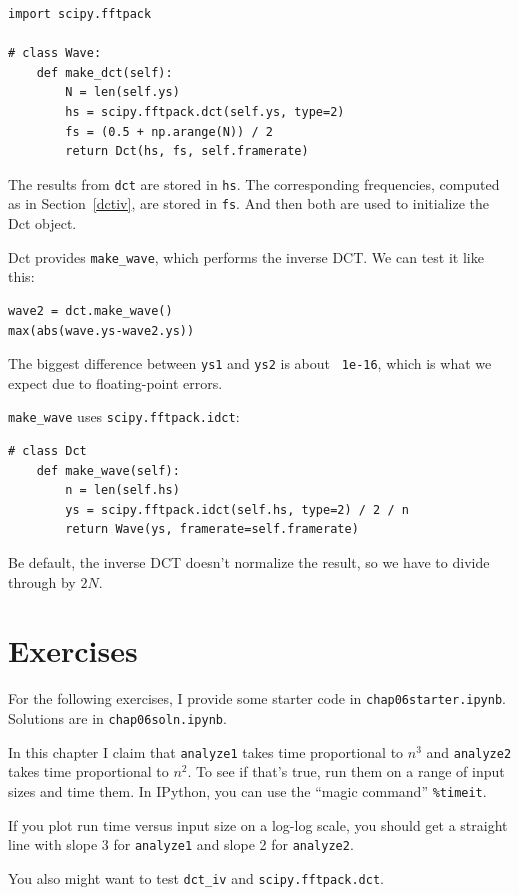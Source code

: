 \documentclass[12pt]{book}
\begin{document}
\begin{verbatim}
import scipy.fftpack

# class Wave:
    def make_dct(self):
        N = len(self.ys)
        hs = scipy.fftpack.dct(self.ys, type=2)
        fs = (0.5 + np.arange(N)) / 2
        return Dct(hs, fs, self.framerate)
\end{verbatim}

The results from {\tt dct} are stored in {\tt hs}.  The corresponding
frequencies, computed as in Section~\ref{dctiv}, are stored in {\tt fs}.
And then both are used to initialize the Dct object.

Dct provides \verb"make_wave", which performs the inverse DCT.
We can test it like this:

\begin{verbatim}
wave2 = dct.make_wave()
max(abs(wave.ys-wave2.ys))
\end{verbatim}

The biggest difference between {\tt ys1} and {\tt ys2} is about {\tt
  1e-16}, which is what we expect due to floating-point errors.

\verb"make_wave" uses {\tt scipy.fftpack.idct}: 

\begin{verbatim}
# class Dct
    def make_wave(self):
        n = len(self.hs)
        ys = scipy.fftpack.idct(self.hs, type=2) / 2 / n
        return Wave(ys, framerate=self.framerate) 
\end{verbatim}

Be default, the inverse DCT doesn't normalize the result, so we have
to divide through by $2N$.


\section{Exercises}

For the following exercises, I provide some starter code in
{\tt chap06starter.ipynb}.
Solutions are in {\tt chap06soln.ipynb}.

\begin{exercise}
In this chapter I claim that {\tt analyze1} takes time proportional
to $n^3$ and {\tt analyze2} takes time proportional to $n^2$.  To
see if that's true, run them on a range of input sizes and time
them.  In IPython, you can use the ``magic command'' \verb"%timeit".

If you plot run time versus input size on a log-log scale, you
should get a straight line with slope 3 for  {\tt analyze1} and
slope 2 for {\tt analyze2}.

You also might want to test \verb"dct_iv"
and {\tt scipy.fftpack.dct}.

\end{exercise}
\end{document}

